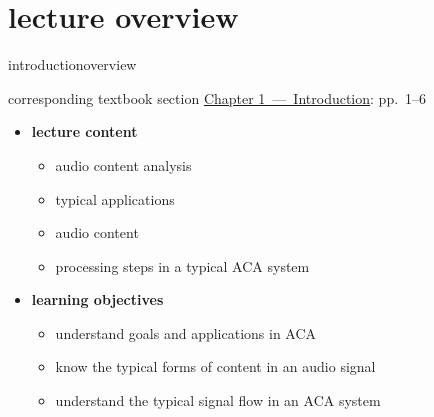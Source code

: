 




\subtitle{Module 1.0: Introduction to MIR/ACA}


	

    \section[overview]{lecture overview}
        \begin{frame}{introduction}{overview}
            \begin{block}{corresponding textbook section}
                    \href{http://ieeexplore.ieee.org/xpl/articleDetails.jsp?tp=&arnumber=6331118&}{Chapter 1~---~Introduction}: pp.~1--6
            \end{block}

            \begin{itemize}
                \item   \textbf{lecture content}
                    \begin{itemize}
                        \item   audio content analysis
                        \item   typical applications
                        \item   audio content
                        \item   processing steps in a typical ACA system
                    \end{itemize}
                \bigskip
                \item<2->   \textbf{learning objectives}
                    \begin{itemize}
                        \item   understand goals and applications in ACA
                        \item   know the typical forms of content in an audio signal
                        \item   understand the typical signal flow in an ACA system
                    \end{itemize}
            \end{itemize}
        \end{frame}
        
